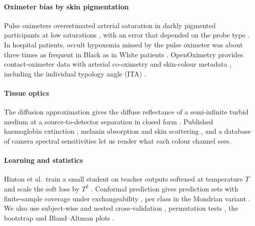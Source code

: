 \documentclass[11pt,letterpaper]{article}
\begin{document}
\paragraph{Oximeter bias by skin pigmentation} Pulse oximeters overestimated arterial saturation in darkly pigmented participants at low saturations \cite{bickler2005}, with an error that depended on the probe type \cite{feiner2007}. In hospital patients, occult hypoxemia missed by the pulse oximeter was about three times as frequent in Black as in White patients \cite{sjoding2020}. OpenOximetry provides contact-oximeter data with arterial co-oximetry and skin-colour metadata \cite{fong2025,openox2025}, including the individual typology angle (ITA) \cite{chardon1991}.

\paragraph{Tissue optics} The diffusion approximation gives the diffuse reflectance of a semi-infinite turbid medium at a source-to-detector separation in closed form \cite{farrell1992}. Published haemoglobin extinction \cite{prahl1998}, melanin absorption and skin scattering \cite{jacques1998}, and a database of camera spectral sensitivities \cite{jiang2013} let us render what each colour channel sees.

\paragraph{Learning and statistics} Hinton et al.\ train a small student on teacher outputs softened at temperature $T$ and scale the soft loss by $T^2$ \cite{hinton2015}. Conformal prediction gives prediction sets with finite-sample coverage under exchangeability \cite{vovk2005,angelopoulos2023}, per class in the Mondrian variant \cite{vovk2012}. We also use subject-wise and nested cross-validation \cite{saeb2017,varma2006}, permutation tests \cite{ojala2010}, the bootstrap \cite{efron1979} and Bland--Altman plots \cite{bland1986}.

\end{document}
